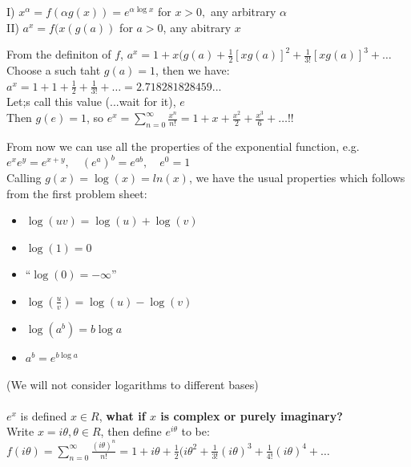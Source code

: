 \begin{Definition} \begin{shaded}
I) $x^{\alpha} = f(\alpha g(x)) = e^{\alpha \log x}$ for $x >0,$ any arbitrary $\alpha$\\
\hspace*{55pt} II) $a^x = f(x(g(a))$ for $a > 0$, any abitrary $x$
\end{shaded} \end{Definition}


From the definiton of $f$, $a^x = 1 + x(g(a) + \frac{1}{2} [xg(a)]^2 + \frac{1}{3!}[xg(a)]^3 + \dots$\\

Choose a such taht $g(a) = 1$, then we have:\\
$a^x = 1 + 1 + \frac{1}{2} + \frac{1}{3!} + \dots = 2.718281828459...$\\

Let;s call this value (...wait for it), $e$\\
 Then $g(e) = 1$, so $e^x = \sum_{n=0}^{\infty} \frac{x^n}{n!} = 1 + x + \frac{x^2}{2} + \frac{x^3}{6} + \dots $!!

From now we can use all the properties of the exponential function, e.g. $e^xe^y = e^{x+y}, \quad (e^a)^b = e^{ab}, \quad e^0 = 1$\\

Calling $g(x) = \log(x) = ln(x)$, we have the usual properties which follows from the first problem sheet:\\
\begin{itemize}
\item $\log(uv) = \log(u) + \log(v)$
\item $\log(1) = 0$
\item ``$\log(0)= -\infty$''
\item $\log (\frac{u}{v}) = \log(u) - \log(v)$
\item $\log(a^b) = b\log a$
\item $a^b = e^{b \log a}$
\end{itemize}
(We will not consider logarithms to different bases)\\\\

$e^x$ is defined $x \in R$, \textbf{ what if $x$ is complex or purely imaginary?}\\

Write $x = i\theta, \theta \in R$, then define $e^{i\theta}$ to be:\\

$f(i \theta) = \sum_{n=0}^{\infty} \frac{(i\theta)^n}{n!} = 1 + i\theta + \frac{1}{2}(i\theta^2 + \frac{1}{3!}(i\theta)^3 + \frac{1}{4!}(i\theta)^4 + \dots$\\

